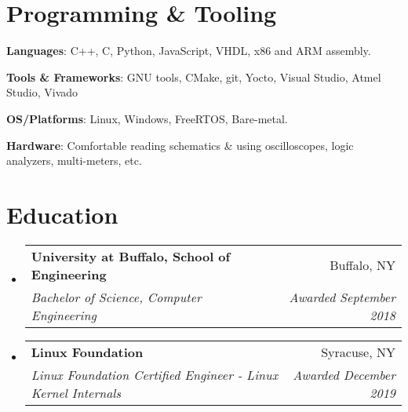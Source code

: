 \documentclass[letterpaper,11pt]{article}
\makeatletter
\newcommand{\resumeSubheading}[4]{
  \vspace{-1pt}\item
    \begin{tabular*}{0.97\textwidth}{l@{\extracolsep{\fill}}r}
      \textbf{#1} & #2 \\
      \textit{\small#3} & \textit{\small #4} \\
    \end{tabular*}\vspace{-5pt}
}
\newcommand{\resumeSubHeadingListStart}{\begin{itemize}[leftmargin=*]}
\newcommand{\resumeSubHeadingListEnd}{\end{itemize}}
\makeatother
\begin{document}
%
\section{Programming \& Tooling}
 \resumeSubHeadingListStart
   \item{
     \textbf{Languages}{: C++, C, Python, JavaScript, VHDL, x86 and ARM assembly.} }
     \hfill
     \item{
      \textbf{Tools \& Frameworks}{: GNU tools, CMake, git, Yocto, Visual Studio, Atmel Studio, Vivado
   } 
\item{
	\textbf{OS/Platforms}{: Linux, Windows, FreeRTOS, Bare-metal.} }
\item {
	\textbf{Hardware}{: Comfortable reading schematics \& using oscilloscopes, logic analyzers, multi-meters, etc.}}

\iffalse
	\item{\textbf{Notable Courses}{: Operating Systems, Machine Learning, Computer Vision, Hardware-Software Integration} }
\fi
} 
 \resumeSubHeadingListEnd
 
 \section{Education}
 \resumeSubHeadingListStart
 \resumeSubheading
 {University at Buffalo, School of Engineering}{Buffalo, NY}
 {Bachelor of Science, Computer Engineering}{Awarded September 2018}
  \resumeSubheading
 {Linux Foundation}{Syracuse, NY}
 {Linux Foundation Certified Engineer - Linux Kernel Internals}{Awarded December 2019}
 \resumeSubHeadingListEnd
 
 


\end{document}
